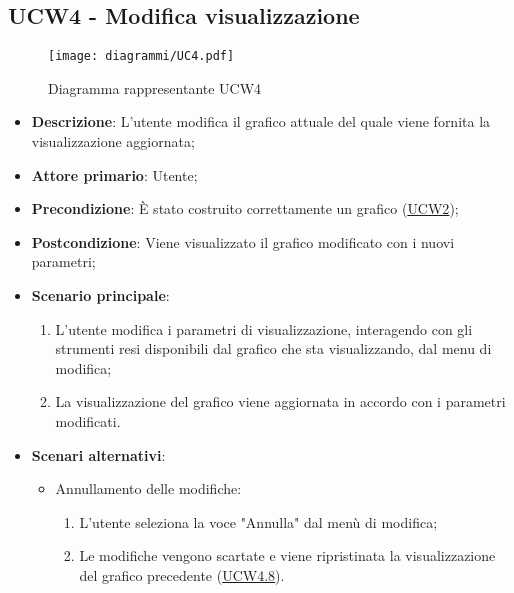 \subsection{UCW4 - Modifica visualizzazione}
\label{sub:ucw4}

\begin{figure}[h]
    \centering
    \texttt{[image: diagrammi/UC4.pdf]}
    \caption{Diagramma rappresentante UCW4}
    \label{fig:UCW4}
\end{figure}


\begin{itemize}
    \item \textbf{Descrizione}: L’utente modifica il grafico attuale del quale viene fornita la visualizzazione 
    aggiornata;

    \item \textbf{Attore primario}: Utente;

    \item \textbf{Precondizione}:   È stato costruito correttamente un grafico (\hyperref[sub:ucw2]{UCW2});

    \item \textbf{Postcondizione}:  Viene visualizzato il grafico modificato con i nuovi parametri;

	\item \textbf{Scenario principale}:
		\begin{enumerate}
            \item L'utente modifica i parametri di visualizzazione, interagendo con gli strumenti resi disponibili dal 
            grafico che sta visualizzando, dal menu di modifica;
            \item La visualizzazione del grafico viene aggiornata in accordo con i parametri modificati.
        \end{enumerate}

    \item \textbf{Scenari alternativi}:
    \begin{itemize}
        \item Annullamento delle modifiche:
        \begin{enumerate}
            \item L'utente seleziona la voce "Annulla" dal menù di modifica;
            \item Le modifiche vengono scartate e viene ripristinata la visualizzazione del grafico precedente 
            (\hyperref[ssub:ucw4.8]{UCW4.8}).
        \end{enumerate}
    \end{itemize}

\end{itemize}

